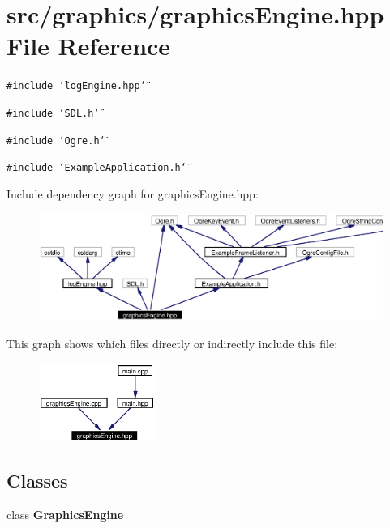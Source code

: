 \section{src/graphics/graphics\-Engine.hpp File Reference}
\label{graphicsEngine_8hpp}
{\tt \#include \char`\"{}log\-Engine.hpp\char`\"{}}\par
{\tt \#include \char`\"{}SDL.h\char`\"{}}\par
{\tt \#include \char`\"{}Ogre.h\char`\"{}}\par
{\tt \#include \char`\"{}Example\-Application.h\char`\"{}}\par


Include dependency graph for graphics\-Engine.hpp:\begin{figure}[H]
\begin{center}
\leavevmode
\includegraphics[width=374pt]{graphicsEngine_8hpp__incl}
\end{center}
\end{figure}


This graph shows which files directly or indirectly include this file:\begin{figure}[H]
\begin{center}
\leavevmode
\includegraphics[width=107pt]{graphicsEngine_8hpp__dep__incl}
\end{center}
\end{figure}
\subsection*{Classes}
\begin{CompactItemize}
\item 
class {\bf Graphics\-Engine}
\end{CompactItemize}
